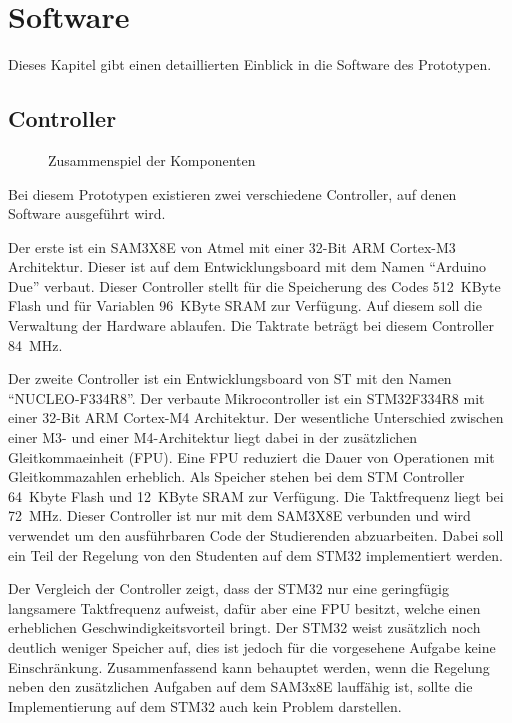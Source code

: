 \chapter{Software}
\label{chap:software}
Dieses Kapitel gibt einen detaillierten Einblick in die Software des Prototypen.


\section{Controller}
\begin{figure}[!h] \centering
	
	\caption{Zusammenspiel der Komponenten}
	\label{fig:samStmSensorsAktuators}
\end{figure}

Bei diesem Prototypen existieren zwei verschiedene Controller, auf denen Software ausgeführt wird.

Der erste ist ein SAM3X8E von Atmel mit einer 32-Bit ARM Cortex-M3 Architektur.
Dieser ist auf dem Entwicklungsboard mit dem Namen "`Arduino Due"' verbaut.
Dieser Controller stellt für die Speicherung des Codes 512~KByte Flash und für Variablen 96~KByte SRAM zur Verfügung.
Auf diesem soll die Verwaltung der Hardware ablaufen.
Die Taktrate beträgt bei diesem Controller 84~MHz.

Der zweite Controller ist ein Entwicklungsboard von ST mit den Namen "`NUCLEO-F334R8"'.
Der verbaute Mikrocontroller ist ein STM32F334R8 mit einer 32-Bit ARM Cortex-M4 Architektur.
Der wesentliche Unterschied zwischen einer M3- und einer M4-Architektur liegt dabei in der zusätzlichen Gleitkommaeinheit (FPU).
Eine FPU reduziert die Dauer von Operationen mit Gleitkommazahlen erheblich.
Als Speicher stehen bei dem STM Controller 64~Kbyte Flash und 12~KByte SRAM zur Verfügung.
Die Taktfrequenz liegt bei 72~MHz.
Dieser Controller ist nur mit dem SAM3X8E verbunden und wird verwendet um den ausführbaren Code der Studierenden abzuarbeiten.
Dabei soll ein Teil der Regelung von den Studenten auf dem STM32 implementiert werden.

Der Vergleich der Controller zeigt, dass der STM32 nur eine geringfügig langsamere Taktfrequenz aufweist, dafür aber eine FPU besitzt, welche einen erheblichen Geschwindigkeitsvorteil bringt.
Der STM32 weist zusätzlich noch deutlich weniger Speicher auf, dies ist jedoch für die vorgesehene Aufgabe keine Einschränkung.
Zusammenfassend kann behauptet werden, wenn die Regelung neben den zusätzlichen Aufgaben auf dem SAM3x8E lauffähig ist, sollte die Implementierung auf dem STM32 auch kein Problem darstellen.

